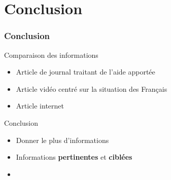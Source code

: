 \section{Conclusion}
\begin{frame}
\frametitle{Conclusion}
  \begin{block}{Comparaison des informations}
    \begin{itemize}
      \item{Article de journal traitant de l'aide apportée}
      \item{Article vidéo centré sur la situation des Français}
      \item{Article internet }
    \end{itemize} 
  \end{block} \pause
  
  \begin{block}{Conclusion}
    \begin{itemize}
      \item{Donner le plus d'informations}
      \item{Informations \textbf{pertinentes} et \textbf{ciblées}}
      \item{}
    \end{itemize}
  \end{block}
\end{frame}

